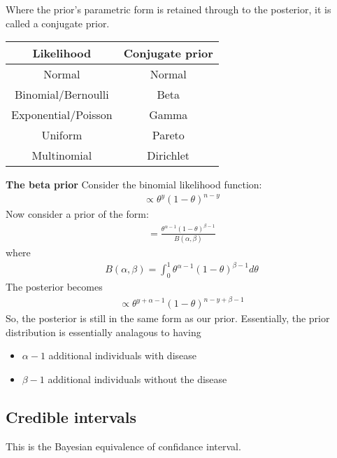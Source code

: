 \documentclass[11pt, oneside, reqno]{amsart}
\numberwithin{equation}{section}
\theoremstyle{plain}%
\theoremstyle{definition}
\theoremstyle{remark}
\begin{document}
Where the prior's parametric form is retained through to the posterior, it is called a conjugate prior.

\begin{center}
 \begin{tabular}{|c|c|} 
 \hline
 Likelihood & Conjugate prior  \\ [0.5ex] 
 \hline
 Normal & Normal \\ 
 \hline
 Binomial/Bernoulli & Beta \\
 \hline
Exponential/Poisson & Gamma \\
 \hline
 Uniform & Pareto \\
 \hline
 Multinomial & Dirichlet \\ [1ex] 
 \hline
\end{tabular}
\end{center}

\textbf{The beta prior}
Consider the binomial likelihood function:
\begin{align*}
	[y|\theta]\propto\theta^y(1-\theta)^{n-y}
\end{align*}
Now consider a prior of the form:
\begin{align*}
	[\theta]=\frac{\theta^{\alpha-1}(1-\theta)^{\beta-1}}{B(\alpha,\beta)}
\end{align*}
where 
\begin{align*}
	B(\alpha,\beta)=\int^1_0\theta^{\alpha-1}(1-\theta)^{\beta-1}d\theta
\end{align*}
The posterior becomes
\begin{align*}
	[\theta|y]\propto\theta^{y+\alpha-1}(1-\theta)^{n-y+\beta-1}
\end{align*}
So, the posterior is still in the same form as our prior. Essentially, the prior distribution is essentially analagous to having
\begin{itemize}
	\item $\alpha-1$ additional individuals with disease
	\item $\beta-1$ additional individuals without the disease
\end{itemize}
\subsection{Credible intervals}
This is the Bayesian equivalence of confidance interval.
\end{document}
